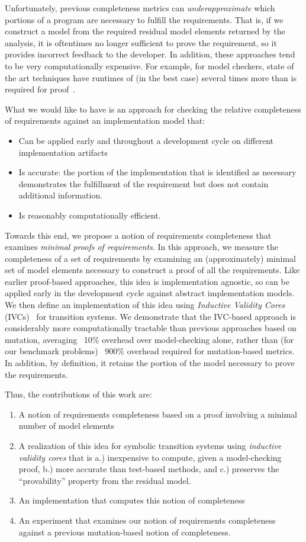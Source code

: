 Unfortunately, previous completeness metrics can {\em underapproximate} which portions of a program are necessary to fulfill the requirements.  That is, if we construct a model from the required residual model elements returned by the analysis, it is oftentimes no longer sufficient to prove the requirement, so it provides incorrect feedback to the developer.  In addition, these approaches tend to be very computationally expensive.  For example, for model checkers, state of the art techniques have runtimes of (in the best case) several times more than is required for proof~\cite{}.

What we would like to have is an approach for checking the relative completeness of requirements against an implementation model that:
\begin{itemize}
    \item Can be applied early and throughout a development cycle on different implementation artifacts
    \item Is accurate: the portion of the implementation that is identified as necessary demonstrates the
        fulfillment of the requirement but does not contain additional information.
    \item Is reasonably computationally efficient.
\end{itemize}

\noindent Towards this end, we propose a notion of requirements completeness that examines {\em minimal proofs of requirements}.  In this approach, we measure the completeness of a set of requirements by examining an (approximately) minimal set of model elements necessary to construct a proof of all the requirements.  Like earlier proof-based approaches, this idea is implementation agnostic, so can be applied early in the development cycle against abstract implementation models.  We then define an implementation of this idea using {\em Inductive Validity Cores} (IVCs)~\cite{Ghass16} for transition systems.  We demonstrate that the IVC-based approach is considerably more computationally tractable than previous approaches based on mutation, averaging ~10\% overhead over model-checking alone, rather than (for our benchmark problems) ~900\% overhead required for mutation-based metrics.  In addition, by definition, it retains the portion of the model necessary to prove the requirements.

Thus, the contributions of this work are:
\begin{enumerate}
\item A notion of requirements completeness based on a proof involving a minimal number of model elements
\item A realization of this idea for symbolic transition systems using {\em inductive validity cores} that is a.) inexpensive to compute, given a model-checking proof, b.) more accurate than test-based methods, and c.) preserves the ``provability'' property from the residual model.
\item An implementation that computes this notion of completeness
\item An experiment that examines our notion of requirements completeness against a previous mutation-based notion of completeness.
\end{enumerate}


